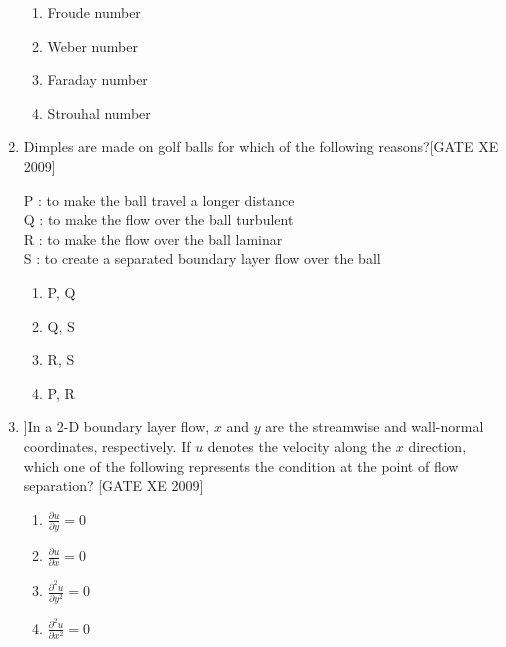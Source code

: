 \documentclass[journal,12pt,onecolumn]{IEEEtran}
\theoremstyle{remark}
\begin{document}
\begin{enumerate}
\begin{multicols}{2}
\begin{enumerate}
       


     \item  Froude number 
     \item  Weber number
     \item  Faraday number
     \item  Strouhal number
\end{enumerate} 
 \end{multicols}


 \item Dimples are made on golf balls for which of the following reasons?\hfill[GATE XE 2009]



\noindent
P : to make the ball travel a longer distance \\
Q : to make the flow over the ball turbulent \\
R : to make the flow over the ball laminar \\
S : to create a separated boundary layer flow over the ball



\begin{multicols}{4}
\begin{enumerate}
\item P, Q
\item Q, S 
\item R, S 
\item P, R 
\end{enumerate} 
 \end{multicols}

\item ]In a 2-D boundary layer flow, $x$ and $y$ are the streamwise and wall-normal coordinates, respectively. If $u$ denotes the velocity along the $x$ direction, which one of the following represents the condition at the point of flow separation?
\hfill[GATE XE 2009]\\
\begin{multicols}{4}
\begin{enumerate}
    \item $\frac{\partial u}{\partial y} = 0$
   \item $\frac{\partial u}{\partial x} = 0$
   \item $\frac{\partial^2 u}{\partial y^2} = 0$
   \item $\frac{\partial^2 u}{\partial x^2} = 0$
\end{enumerate} 
 \end{multicols}


\end{enumerate}
\end{document}
